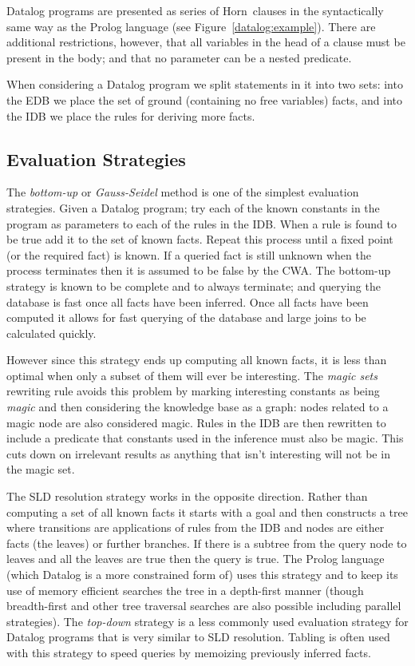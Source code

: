 \documentclass[a4paper,sfsidenotes]{tufte-book}
\begin{document}
Datalog programs are presented as series of Horn~clauses in the syntactically
same way as the Prolog language (see Figure~\ref{datalog:example}).  There are
additional restrictions, however, that all variables in the head of a clause
must be present in the body; and that no parameter can be a nested predicate.

When considering a Datalog program we split statements in it into two sets: into
the \ac{EDB} we place the set of ground (containing no free variables) facts,
and into the \ac{IDB} we place the rules for deriving more facts.

\subsection{Evaluation Strategies}

The \emph{bottom-up} or \emph{Gauss-Seidel} method is one of the simplest
evaluation strategies\cite{Ceri:1989ff}.  Given a Datalog program; try each of
the known constants in the program as parameters to each of the rules in the
\ac{IDB}.  When a rule is found to be true add it to the set of known facts.
Repeat this process until a fixed point (or the required fact) is known.  If a
queried fact is still unknown when the process terminates then it is assumed to
be false by the \ac{CWA}.  The bottom-up strategy is known to be
complete and to always terminate; and querying the database is fast once all
facts have been inferred.  Once all facts have been computed it allows for fast
querying of the database and large joins to be calculated quickly.

However since this strategy ends up computing all known facts, it is less than
optimal when only a subset of them will ever be interesting.  The \emph{magic
sets}\cite{Bancilhon:1985cz} rewriting rule avoids this problem by marking
interesting constants as being \emph{magic} and then considering the knowledge
base as a graph: nodes related to a magic node are also considered magic.  Rules
in the \ac{IDB} are then rewritten to include a predicate that constants used in
the inference must also be magic.  This cuts down on irrelevant results as
anything that isn't interesting will not be in the magic set.

The \ac{SLD} resolution strategy works in the opposite direction.  Rather than
computing a set of all known facts it starts with a goal and then constructs a
tree where transitions are applications of rules from the \ac{IDB} and nodes are
either facts (the leaves) or further branches.  If there is a subtree from the
query node to leaves and all the leaves are true then the query is true.  The
Prolog language (which Datalog is a more constrained form of) uses this strategy
and to keep its use of memory efficient searches the tree in a depth-first
manner (though breadth-first and other tree traversal searches are also possible
including parallel strategies).  
The \emph{top-down} strategy is a less commonly used evaluation strategy for Datalog
programs that is very similar to \ac{SLD} resolution. Tabling is often used with
this strategy to speed queries by memoizing previously inferred facts.
\end{document}
